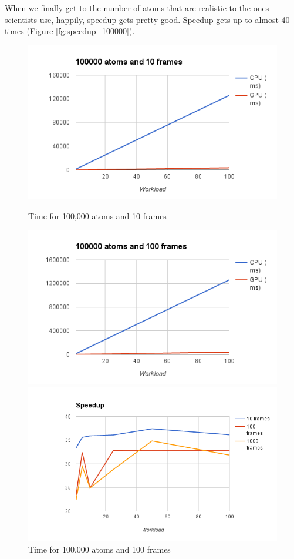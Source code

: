 \documentclass[11pt,a4paper]{report}
\begin{document}
When we finally get to the number of atoms that are realistic to the ones scientists use, happily, speedup gets pretty good. Speedup gets up to almost 40 times (Figure \ref{fg:speedup_100000}).


\begin{figure}[!tbp]
  \centering
  \begin{minipage}[b]{0.4\textwidth}
    \includegraphics[width=\textwidth]{images/exp_100000_10}
    \caption{Time for 100,000 atoms and 10 frames}
    \label{fg:exp_100000_10}
  \end{minipage}
  \hfill
  \begin{minipage}[b]{0.4\textwidth}
    \includegraphics[width=\textwidth]{images/exp_100000_100}
    \caption{Time for 100,000 atoms and 100 frames}
     \label{fg:exp_100000_100}
  \end{minipage}
  \hfill
  \begin{minipage}[b]{0.4\textwidth}
    \includegraphics[width=\textwidth]{images/speedup_100000}

\end{minipage}
\end{figure}
\end{document}
